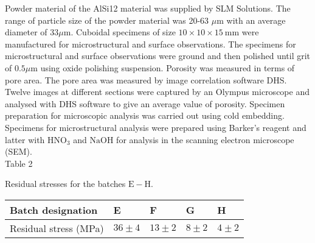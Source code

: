 \documentclass[10pt]{article}
\begin{document}
Powder material of the AlSi12 material was supplied by SLM Solutions. The range of particle size of the powder material was 20-63 $\mu \mathrm{m}$ with an average diameter of $33 \mu \mathrm{m}$. Cuboidal specimens of size $10 \times 10 \times 15 \mathrm{~mm}$ were manufactured for microstructural and surface observations. The specimens for microstructural and surface observations were ground and then polished until grit of $0.5 \mu \mathrm{m}$ using oxide polishing suspension. Porosity was measured in terms of pore area. The pore area was measured by image correlation software DHS. Twelve images at different sections were captured by an Olympus microscope and analysed with DHS software to give an average value of porosity. Specimen preparation for microscopic analysis was carried out using cold embedding. Specimens for microstructural analysis were prepared using Barker's reagent and latter with $\mathrm{HNO}_{3}$ and $\mathrm{NaOH}$ for analysis in the scanning electron microscope (SEM).\\
Table 2

Residual stresses for the batches $\mathrm{E}-\mathrm{H}$.

\begin{center}
\begin{tabular}{lllll}
\hline
Batch designation & E & F & G & H \\
\hline
Residual stress (MPa) & $36 \pm 4$ & $13 \pm 2$ & $8 \pm 2$ & $4 \pm 2$ \\
\hline
\end{tabular}
\end{center}
\end{document}
